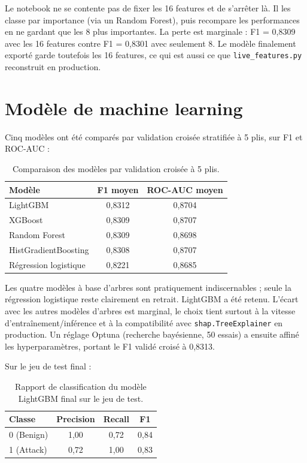 \documentclass[12pt,a4paper]{report}
\begin{document}
Le notebook ne se contente pas de fixer les 16 features et de s'arrêter là. Il les classe par importance (via un Random Forest), puis recompare les performances en ne gardant que les 8 plus importantes. La perte est marginale : F1 = 0,8309 avec les 16 features contre F1 = 0,8301 avec seulement 8. Le modèle finalement exporté garde toutefois les 16 features, ce qui est aussi ce que \texttt{live\_features.py} reconstruit en production.

\section{Modèle de machine learning}

Cinq modèles ont été comparés par validation croisée stratifiée à 5 plis, sur F1 et ROC-AUC :

\begin{table}[h]
\centering
\begin{tabular}{@{}lcc@{}}
\toprule
\textbf{Modèle} & \textbf{F1 moyen} & \textbf{ROC-AUC moyen} \\
\midrule
LightGBM & 0,8312 & 0,8704 \\
XGBoost & 0,8309 & 0,8707 \\
Random Forest & 0,8309 & 0,8698 \\
HistGradientBoosting & 0,8308 & 0,8707 \\
Régression logistique & 0,8221 & 0,8685 \\
\bottomrule
\end{tabular}
\caption{Comparaison des modèles par validation croisée à 5 plis.}
\end{table}

Les quatre modèles à base d'arbres sont pratiquement indiscernables ; seule la régression logistique reste clairement en retrait. LightGBM a été retenu. L'écart avec les autres modèles d'arbres est marginal, le choix tient surtout à la vitesse d'entraînement/inférence et à la compatibilité avec \texttt{shap.TreeExplainer} en production. Un réglage Optuna (recherche bayésienne, 50 essais) a ensuite affiné les hyperparamètres, portant le F1 validé croisé à 0,8313.

Sur le jeu de test final :

\begin{table}[h]
\centering
\begin{tabular}{@{}lccc@{}}
\toprule
\textbf{Classe} & \textbf{Precision} & \textbf{Recall} & \textbf{F1} \\
\midrule
0 (Benign) & 1,00 & 0,72 & 0,84 \\
1 (Attack) & 0,72 & 1,00 & 0,83 \\
\bottomrule
\end{tabular}
\caption{Rapport de classification du modèle LightGBM final sur le jeu de test.}
\end{table}
\end{document}
